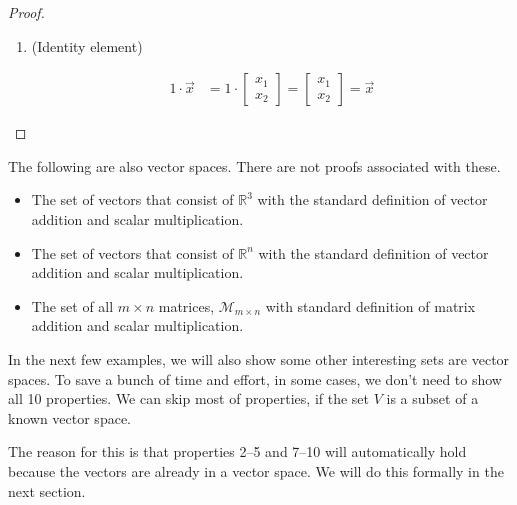 \begin{proof}
\begin{enumerate}
\item (Identity element)

\begin{align*}
1 \cdot \vec{x} & = 1\cdot  \begin{bmatrix}
x_1 \\ x_2 
\end{bmatrix} = \begin{bmatrix}
x_1 \\ x_2 
\end{bmatrix} = \vec{x}
\end{align*}

\end{enumerate}
\end{proof}


The following are also vector spaces.  There are not proofs associated with these.  

\begin{itemize}
 
 \item The set of vectors that consist of  $\mathbb{R}^3$ with the standard definition of vector addition and scalar multiplication. 
 \item The set of vectors that consist of  $\mathbb{R}^n$ with the standard definition of vector addition and scalar multiplication. 
\item The set of all $m \times n$ matrices, $\mathcal{M}_{m \times n}$ with standard definition of matrix addition and scalar multiplication. 

\end{itemize}

In the next few examples, we will also show some other interesting sets are vector spaces.  To save a bunch of time and effort, in some cases, we don't need to show all 10 properties.  We can skip most of properties, if the set $V$ is a subset of a known vector space.  

The reason for this is that properties 2--5 and 7--10 will automatically hold because the vectors are already in a vector space.  We will do this formally in the next section.  


